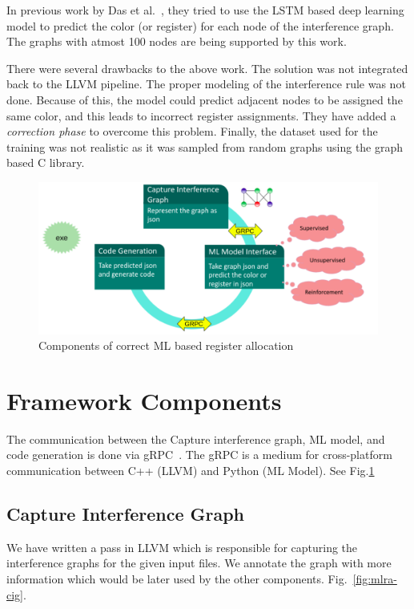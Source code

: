 In previous work by Das et al.~\cite{dlra:LLVMHPC_2020}, they tried to use the LSTM based deep learning model to predict the color (or register) for each node of the interference graph. The graphs with atmost 100 nodes are being supported by this work. 

There were several drawbacks to the above work. The solution was not integrated back to the LLVM pipeline. The proper modeling of the interference rule was not done. Because of this, the model could predict adjacent nodes to be assigned the same color, and this leads to incorrect register assignments. They have added a \textit{correction phase} to overcome this problem. Finally, the dataset used for the training was not realistic as it was sampled from random graphs using the graph based C library.

\begin{figure}[t]
    \centering
    \includegraphics[scale=0.4]{figures/chapter-5/mlra_components.png}
    \caption{Components of correct ML based register allocation}
     \label{fig:mlra-components}
\end{figure}

\section{Framework Components}\label{sec:mlra:components}
The communication between the Capture interference graph, ML model, and code generation is done via gRPC~\cite{grpc}. The gRPC is a medium for cross-platform communication between C++ (LLVM) and Python (ML Model). See Fig.\ref{fig:mlra-components}
\subsection{Capture Interference Graph}
We have written a pass in LLVM which is responsible for capturing the interference graphs for the given input files. We annotate the graph with more information which would be later used by the other components. Fig.~\ref{fig:mlra-cig}.

